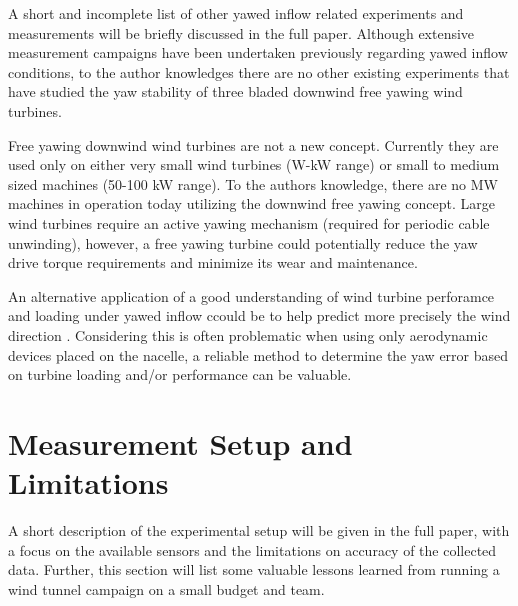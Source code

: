 \documentclass[a4paper]{jpconf}
\begin{document}
A short and incomplete list of other yawed inflow related experiments and measurements will be briefly discussed in the full paper. Although extensive measurement campaigns have been undertaken previously regarding yawed inflow conditions, to the author knowledges there are no other existing experiments that have studied the yaw stability of three bladed downwind free yawing wind turbines.

Free yawing downwind wind turbines are not a new concept. Currently they are used only on either very small wind turbines (W-kW range) or small to medium sized machines (50-100 kW range). To the authors knowledge, there are no MW machines in operation today utilizing the downwind free yawing concept. Large wind turbines require an active yawing mechanism (required for periodic cable unwinding), however, a free yawing turbine could potentially reduce the yaw drive torque requirements and minimize its wear and maintenance. 

An alternative application of a good understanding of wind turbine perforamce and loading under yawed inflow ccould be to help predict more precisely the wind direction \cite{bottasso_validation_2015}. Considering this is often problematic when using only aerodynamic devices placed on the nacelle, a reliable method to determine the yaw error based on turbine loading and/or performance can be valuable.


\section{Measurement Setup and Limitations}

A short description of the experimental setup will be given in the full paper, with a focus on the available sensors and the limitations on accuracy of the collected data. Further, this section will list some valuable lessons learned from running a wind tunnel campaign on a small budget and team.



%
\end{document}

